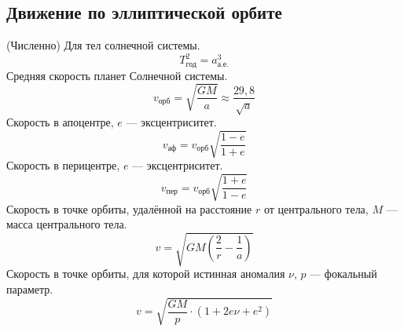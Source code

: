 \subsection{Движение по эллиптической орбите}

(Численно) Для тел солнечной системы.$$T^2_{\text{год}}=a^3_{\text{а.е.}}$$
Средняя скорость планет Солнечной системы.$$v_{\text{орб}}=\sqrt{\frac{GM}{a}}\approx \frac{29,8}{\sqrt{a}}$$
Скорость в апоцентре, $e$ --- эксцентриситет.$$v_{\text{аф}}=v_{\text{орб}}\sqrt{\frac{1-e}{1+e}}$$
Скорость в перицентре, $e$ --- эксцентриситет.$$v_{\text{пер}}=v_{\text{орб}}\sqrt{\frac{1+e}{1-e}}$$
Скорость в точке орбиты, удалённой на расстояние $r$ от центрального тела, $M$ --- масса центрального тела.$$v=\sqrt{GM\left(\frac2r - \frac1a\right)}$$
Скорость в точке орбиты, для которой истинная аномалия $\nu$, $p$ --- фокальный параметр.$$v=\sqrt{\frac{GM}{p}\cdot(1+2e\nu+e^2)}$$